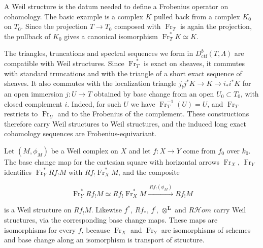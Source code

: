 \documentclass[11pt]{article}
\providecommand{\cHom}{}\renewcommand{\cHom}{R\mathcal{H}\!om}
\begin{document}
\label{bp157}%
A Weil structure is the datum needed to define a Frobenius operator on cohomology. The basic example is a complex \(K\) pulled back from a complex \(K_0\) on \(T_0\). Since the projection \(T\to T_0\) composed with \(\operatorname{Fr}_T\) is again the projection, the pullback of \(K_0\) gives a canonical isomorphism \(\operatorname{Fr}_T^*K\simeq K\).

The triangles, truncations and spectral sequences we form in \(D^b_{\mathrm{ctf}}(T,\Lambda)\) are compatible with Weil structures. Since \(\operatorname{Fr}_T^*\) is exact on sheaves, it commutes with standard truncations and with the triangle of a short exact sequence of sheaves. It also commutes with the localization triangle \(j_!j^*K\to K\to i_*i^*K\) for an open immersion \(j:U\to T\) obtained by base change from an open \(U_0\subset T_0\), with closed complement \(i\). Indeed, for such \(U\) we have \(\operatorname{Fr}_T^{-1}(U)=U\), and \(\operatorname{Fr}_T\) restricts to \(\operatorname{Fr}_U\) and to the Frobenius of the complement. These constructions therefore carry Weil structures to Weil structures, and the induced long exact cohomology sequences are Frobenius-equivariant.

Let \((M,\phi_M)\) be a Weil complex on \(X\) and let \(f:X\to Y\) come from \(f_0\) over \(k_0\). The base change map for the cartesian square with horizontal arrows \(\operatorname{Fr}_X\), \(\operatorname{Fr}_Y\) identifies \(\operatorname{Fr}_Y^*Rf_{!}M\) with \(Rf_{!}\operatorname{Fr}_X^*M\), and the composite

\[
\operatorname{Fr}_Y^*Rf_{!}M
\simeq Rf_{!}\operatorname{Fr}_X^*M
\xrightarrow{\ Rf_{!}(\phi_M)\ }Rf_{!}M
\]

is a Weil structure on \(Rf_!M\). Likewise \(f^*\), \(Rf_*\), \(f^!\), \(\otimes^{\mathbf L}\) and \(\cHom\) carry Weil structures, via the corresponding base change maps. These maps are isomorphisms for every \(f\), because \(\operatorname{Fr}_X\) and \(\operatorname{Fr}_Y\) are isomorphisms of schemes and base change along an isomorphism is transport of structure.
\end{document}
